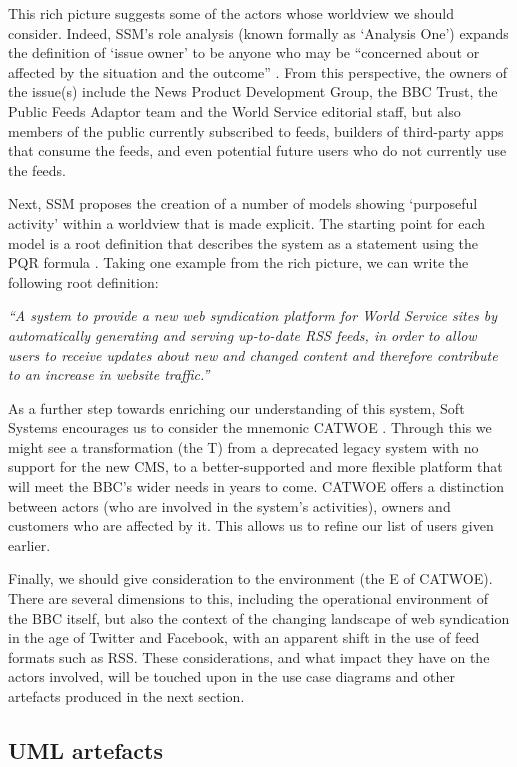 \documentclass[runningheads,a4paper]{llncs}
\begin{document}
This rich picture suggests some of the actors whose worldview we should consider. Indeed, SSM's role analysis (known formally as `Analysis One') expands the definition of `issue owner' to be anyone who may be ``concerned about or affected by the situation and the outcome'' \cite{checkland2006}. From this perspective, the owners of the issue(s) include the News Product Development Group, the BBC Trust, the Public Feeds Adaptor team and the World Service editorial staff, but also members of the public currently subscribed to feeds, builders of third-party apps that consume the feeds, and even potential future users who do not currently use the feeds.

Next, SSM proposes the creation of a number of models showing `purposeful activity' within a worldview that is made explicit. The starting point for each model is a root definition that describes the system as a statement using the PQR formula \cite{checkland2006}. Taking one example from the rich picture, we can write the following root definition:

\textit{``A system to provide a new web syndication platform for World Service sites by automatically generating and serving up-to-date RSS feeds, in order to allow users to receive updates about new and changed content and therefore contribute to an increase in website traffic.''}

As a further step towards enriching our understanding of this system, Soft Systems encourages us to consider the mnemonic CATWOE \cite{checkland2006}. Through this we might see a transformation (the T) from a deprecated legacy system with no support for the new CMS, to a better-supported and more flexible platform that will meet the BBC's wider needs in years to come. CATWOE offers a distinction between actors (who are involved in the system's activities), owners and customers who are affected by it. This allows us to refine our list of users given earlier.

Finally, we should give consideration to the environment (the E of CATWOE). There are several dimensions to this, including the operational environment of the BBC itself, but also the context of the changing landscape of web syndication in the age of Twitter and Facebook, with an apparent shift in the use of feed formats such as RSS. These considerations, and what impact they have on the actors involved, will be touched upon in the use case diagrams and other artefacts produced in the next section.


\subsection{UML artefacts}
\end{document}

